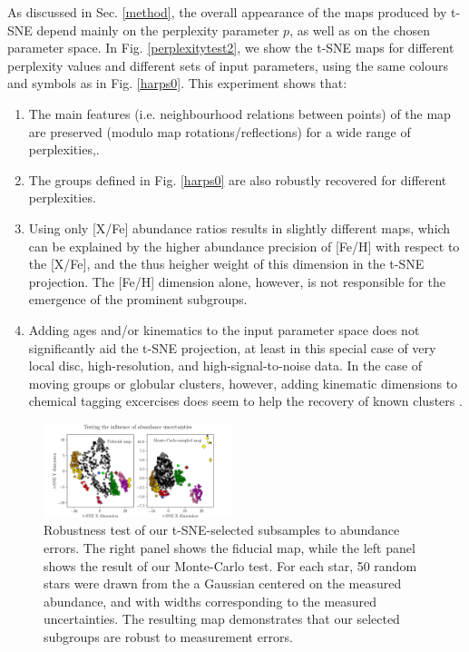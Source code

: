 \documentclass{aa}  %
\begin{document}
As discussed in Sec. \ref{method}, the overall appearance of the maps produced by t-SNE depend mainly on the perplexity parameter $p$, as well as on the chosen parameter space. In Fig. \ref{perplexitytest2}, we show the t-SNE maps for different perplexity values and different sets of input parameters, using the same colours and symbols as in Fig. \ref{harps0}. This experiment shows that: 
\begin{enumerate}
 \item The main features (i.e. neighbourhood relations between points) of the map are preserved (modulo map rotations/reflections) for a wide range of perplexities,.
 \item The groups defined in Fig. \ref{harps0} are also robustly recovered for different perplexities.
 \item Using only [X/Fe] abundance ratios results in slightly different maps, which can be explained by the higher abundance precision of [Fe/H] with respect to the [X/Fe], and the thus heigher weight of this dimension in the t-SNE projection. The [Fe/H] dimension alone, however, is not responsible for the emergence of the prominent subgroups.
 \item Adding ages and/or kinematics to the input parameter space does not significantly aid the t-SNE projection, at least in this special case of very local disc, high-resolution, and high-signal-to-noise data.%
 In the case of moving groups or globular clusters, however, adding kinematic dimensions to chemical tagging excercises does seem to help the recovery of known clusters \citep{Chen2017}.
\end{enumerate}

\begin{figure}\centering
 \includegraphics[width=0.49\textwidth]{im/harps_tsne-mctest_teffcut.png}
\caption{Robustness test of our t-SNE-selected subsamples to abundance errors. The right panel shows the fiducial map, while the left panel shows the result of our Monte-Carlo test. For each star, 50 random stars were drawn from the a Gaussian centered on the measured abundance, and with widths corresponding to the measured uncertainties. The resulting map demonstrates that our selected subgroups are robust to measurement errors.}
\label{mctest}
\end{figure}
\end{document}
